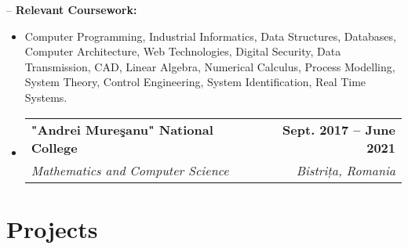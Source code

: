 \documentclass[letterpaper,11pt]{article}
\makeatletter
\newcommand{\resumeItem}[1]{
  \item\small{
    {#1 \vspace{-2pt}}
  }
}
\newcommand{\resumeSubheading}[4]{
  \vspace{-2pt}\item
    \begin{tabular*}{1.0\textwidth}[t]{l@{\extracolsep{\fill}}r}
      \textbf{#1} & \textbf{\small #2} \\
      \textit{\small#3} & \textit{\small #4} \\
    \end{tabular*}\vspace{-7pt}
}
\newcommand{\resumeProjectHeading}[2]{
    \item
    \begin{tabular*}{1.001\textwidth}{l@{\extracolsep{\fill}}r}
      \small#1 & \textbf{\small #2}\\
    \end{tabular*}\vspace{-7pt}
}
\newcommand{\resumeSubHeadingListStart}{\begin{itemize}[leftmargin=0.0in, label={}]}
\newcommand{\resumeSubHeadingListEnd}{\end{itemize}}
\newcommand{\resumeItemListStart}{\begin{itemize}}
\newcommand{\resumeItemListEnd}{\end{itemize}\vspace{-5pt}}
\makeatother
\begin{document}
-- {\textbf{Relevant Coursework:}}
 \resumeItemListStart
        \resumeItem{
 Computer Programming, Industrial Informatics, Data Structures, Databases, Computer Architecture, Web Technologies, Digital Security, Data Transmission, CAD, Linear Algebra, Numerical Calculus, Process Modelling, System Theory, Control Engineering, System Identification, Real Time Systems.}
    \resumeItemListEnd
\resumeSubHeadingListStart
\resumeSubheading
      {"Andrei Mureşanu" National College}{Sept. 2017 -- June 2021}
      {Mathematics and Computer Science}{Bistrița, Romania}
  \resumeSubHeadingListEnd  

\section{Projects}

\begin{comment}
    

\vspace{-5pt}
    \resumeSubHeadingListStart
      \resumeProjectHeading
          {\textbf{ Full-Stack E-commerce Website for PC Components} $|$ \emph{ASP .NET Core, React, Vite, Entity Framework}}{Ongoing}
          \resumeItemListStart
          \resumeItem{Leading a team in the development of a full-stack e-commerce platform specializing in PC components. Collaborating closely with team members to optimize website performance and ensure responsive design across various devices.}
            \resumeItem{Spearheading the implementation of user-friendly interfaces to ensure seamless browsing and purchasing experiences.}
            \resumeItem{Overseeing the integration of robust security measures to safeguard user data and transactions.}
    \resumeItemListEnd
    \resumeSubHeadingListEnd
   \end{comment}
\end{document}
